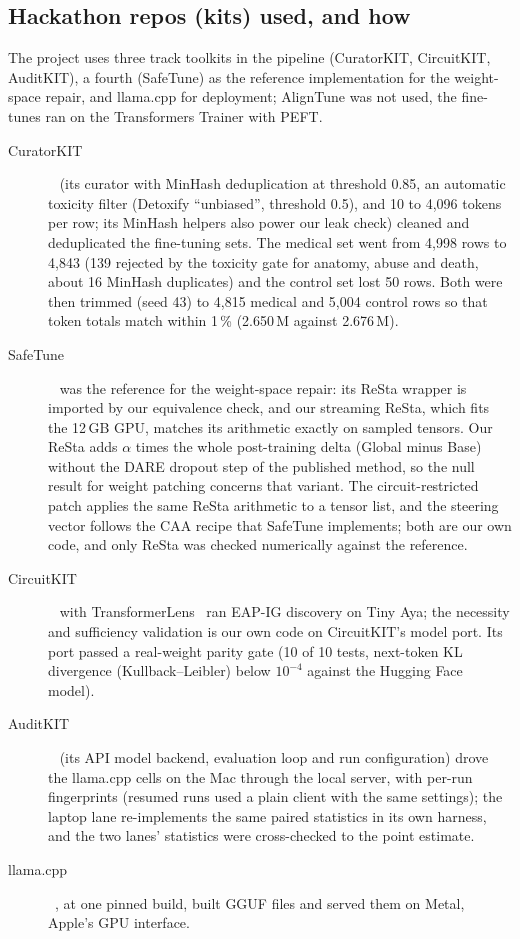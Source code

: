 \subsection{Hackathon repos (kits) used, and how}
The project uses three track toolkits in the pipeline (CuratorKIT, CircuitKIT, AuditKIT), a fourth (SafeTune) as the reference implementation for the weight-space repair, and llama.cpp for deployment; AlignTune was not used, the fine-tunes ran on the Transformers Trainer with PEFT.
\begin{description}
\item[CuratorKIT]~\cite{bhattacharjee2026curatorkit} (its curator with MinHash deduplication at threshold 0.85, an automatic toxicity filter (Detoxify ``unbiased'', threshold 0.5), and 10 to 4,096 tokens per row; its MinHash helpers also power our leak check) cleaned and deduplicated the fine-tuning sets. The medical set went from 4,998 rows to 4,843 (139 rejected by the toxicity gate for anatomy, abuse and death, about 16 MinHash duplicates) and the control set lost 50 rows. Both were then trimmed (seed 43) to 4,815 medical and 5,004 control rows so that token totals match within 1\,\% (2.650\,M against 2.676\,M).
\item[SafeTune]~\cite{seth2026safetune} was the reference for the weight-space repair: its ReSta wrapper is imported by our equivalence check, and our streaming ReSta, which fits the 12\,GB GPU, matches its arithmetic exactly on sampled tensors. Our ReSta adds $\alpha$ times the whole post-training delta (Global minus Base) without the DARE dropout step of the published method, so the null result for weight patching concerns that variant. The circuit-restricted patch applies the same ReSta arithmetic to a tensor list, and the steering vector follows the CAA recipe that SafeTune implements; both are our own code, and only ReSta was checked numerically against the reference.
\item[CircuitKIT]~\cite{seth2026circuitkit} with TransformerLens~\cite{tlens} ran EAP-IG discovery on Tiny Aya; the necessity and sufficiency validation is our own code on CircuitKIT's model port. Its port passed a real-weight parity gate (10 of 10 tests, next-token KL divergence (Kullback--Leibler) below $10^{-4}$ against the Hugging Face model).
\item[AuditKIT]~\cite{auditkit2026} (its API model backend, evaluation loop and run configuration) drove the llama.cpp cells on the Mac through the local server, with per-run fingerprints (resumed runs used a plain client with the same settings); the laptop lane re-implements the same paired statistics in its own harness, and the two lanes' statistics were cross-checked to the point estimate.
\item[llama.cpp]~\cite{llamacpp}, at one pinned build, built GGUF files and served them on Metal, Apple's GPU interface.
\end{description}

